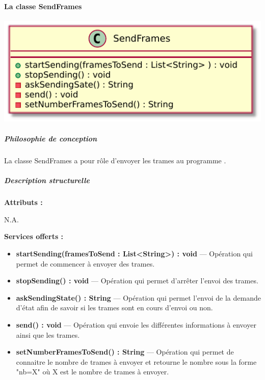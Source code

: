 \paragraph{La classe SendFrames}

\begin{minipage}
    {\linewidth}
    \centering
    \includegraphics[width=\linewidth]{../schemas/Conception_detaillee/diag_class_sender_client.pdf}
\end{minipage}

\subparagraph{Philosophie de conception \newline} 

\medspace

La classe SendFrames a pour rôle d'envoyer les trames au programme {\nomLogiciel}.  

\subparagraph{Description structurelle \newline}

\medspace

\textbf{Attributs :}

N.A.

\textbf{Services offerts :}

\begin{itemize}
    \item \textbf{startSending(framesToSend : List<String>) : void} --- Opération qui permet de commencer à envoyer des trames. 
    \item \textbf{stopSending() : void } --- Opération qui permet d'arrêter l'envoi des trames. 
    \item \textbf{askSendingState() : String } --- Opération qui permet l'envoi de la demande d'état afin de savoir si les trames sont en cours d'envoi ou non. 
    \item \textbf{send() : void} --- Opération qui envoie les différentes informations à envoyer ainsi que les trames. 
    \item \textbf{setNumberFramesToSend() : String } --- Opération qui permet de connaitre le nombre de trames à envoyer et retourne le nombre sous la forme "nb=X" où X est le nombre de trames à envoyer. 
\end{itemize}